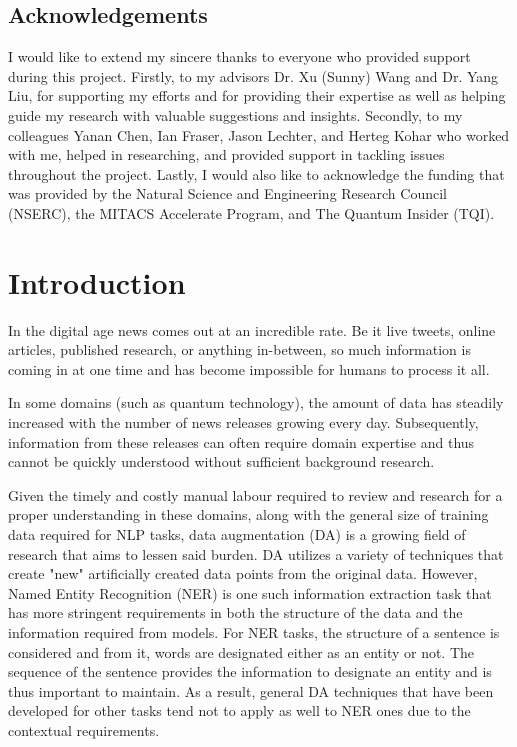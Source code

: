 \documentclass[12pt]{report}
\begin{document}
\section*{Acknowledgements}

    I would like to extend my sincere thanks to everyone who provided support during this project. Firstly, to my advisors Dr. Xu (Sunny) Wang and Dr. Yang Liu, for supporting my efforts and for providing their expertise as well as helping guide my research with valuable suggestions and insights. Secondly, to my colleagues Yanan Chen, Ian Fraser, Jason Lechter, and Herteg Kohar who worked with me, helped in researching, and provided support in tackling issues throughout the project. Lastly, I would also like to acknowledge the funding that was provided by the Natural Science and Engineering Research Council (NSERC), the MITACS Accelerate Program, and The Quantum Insider (TQI).
    
\newpage

\tableofcontents %

\listoftables
\listoffigures




\chapter{Introduction}
    In the digital age news comes out at an incredible rate. Be it live tweets, online articles, published research, or anything in-between, so much information is coming in at one time and has become impossible for humans to process it all.
    
    
    In some domains (such as quantum technology), the amount of data has steadily increased with the number of news releases growing every day. Subsequently, information from these releases can often require domain expertise and thus cannot be quickly understood without sufficient background research.
    
    Given the timely and costly manual labour required to review and research for a proper understanding in these domains, along with the general size of training data required for NLP tasks, data augmentation (DA) is a growing field of research that aims to lessen said burden. DA utilizes a variety of techniques that create "new" artificially created data points from the original data. However, Named Entity Recognition (NER) is one such information extraction task that has more stringent requirements in both the structure of the data and the information required from models. For NER tasks, the structure of a sentence is considered and from it, words are designated either as an entity or not. The sequence of the sentence provides the information to designate an entity and is thus important to maintain. As a result, general DA techniques that have been developed for other tasks tend not to apply as well to NER ones due to the contextual requirements.
    
\end{document}
